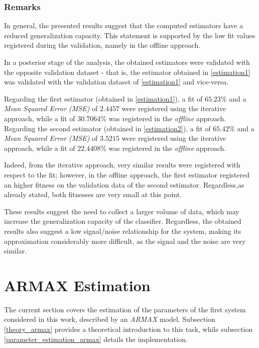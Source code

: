 \documentclass[12pt]{article}
\begin{document}
\subsubsection{Remarks}

In general, the presented results suggest that the computed estimators have a reduced generalization capacity. This statement is supported by the low fit values registered during the validation, namely in the offline approach.

In a posterior stage of the analysis, the obtained estimators were validated with the opposite validation dataset - that is, the estimator obtained in \ref{estimation1} was validated with the validation dataset of \ref{estimation1} and vice-versa.

Regarding the first estimator (obtained in \ref{estimation1}), a fit of $65.23\%$ and a \emph{Mean Squared Error (MSE)} of $2.4457$ were registered using the iterative approach, while a fit of $30.7064 \%$ was registered in the \emph{offline} approach. Regarding the second estimator (obtained in \ref{estimation2}), a fit of $65.42\%$ and a \emph{Mean Squared Error (MSE)} of $3.5215$ were registered using the iterative approach, while a fit of $22.4408 \%$ was registered in the \emph{offline} approach.

Indeed, from the iterative approach, very similar results were registered with respect to the fit; however, in the offline approach, the first estimator registered an higher fitness on the validation data of the second estimator. Regardless,as already stated, both fitnesses are very small at this point.

These results suggest the need to collect a larger volume of data, which may increase the generalization capacity of the classifier. Regardless, the obtained results also suggest a low signal/noise relationship for the system, making its approximation considerably more difficult, as the signal and the noise are very similar.

\section{ARMAX Estimation}
\label{armax_estimation}

The current section covers the estimation of the parameters of the first system considered in this work, described by an \emph{ARMAX} model. Subsection \ref{theory_armax} provides a theoretical introduction to this task, while subsection \ref{parameter_estimation_armax} details the implementation.
\end{document}
